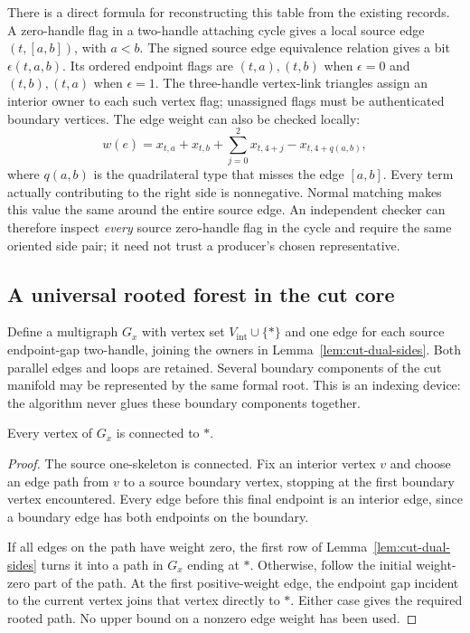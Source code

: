 There is a direct formula for reconstructing this table from the existing
records.  A zero-handle flag in a two-handle attaching cycle gives a local
source edge $(t,[a,b])$, with $a<b$.  The signed source edge equivalence
relation gives a bit $\epsilon(t,a,b)$.  Its ordered endpoint flags are
$(t,a),(t,b)$ when $\epsilon=0$ and $(t,b),(t,a)$ when $\epsilon=1$.
The three-handle vertex-link triangles assign an interior owner to each
such vertex flag; unassigned flags must be authenticated boundary vertices.
The edge weight can also be checked locally:
\begin{equation}
 w(e)=x_{t,a}+x_{t,b}
       +\sum_{j=0}^{2}x_{t,4+j}-x_{t,4+q(a,b)},
 \label{eq:cut-dual-local-weight}
\end{equation}
where $q(a,b)$ is the quadrilateral type that misses the edge $[a,b]$.
Every term actually contributing to the right side is nonnegative.
Normal matching makes this value the same around the entire source edge.
An independent checker can therefore inspect \emph{every} source
zero-handle flag in the cycle and require the same oriented side pair;
it need not trust a producer's chosen representative.

\subsection{A universal rooted forest in the cut core}

Define a multigraph $G_x$ with vertex set $V_{\mathrm{int}}\cup\{\ast\}$
and one edge for each source endpoint-gap two-handle, joining the owners
in Lemma~\ref{lem:cut-dual-sides}.  Both parallel edges and loops are
retained.  Several boundary components of the cut manifold may be
represented by the same formal root.  This is an indexing device: the
algorithm never glues these boundary components together.

\begin{lemma}
\label{lem:cut-dual-connected}
Every vertex of $G_x$ is connected to $\ast$.
\end{lemma}

\begin{proof}
The source one-skeleton is connected.  Fix an interior vertex $v$ and
choose an edge path from $v$ to a source boundary vertex, stopping at the
first boundary vertex encountered.  Every edge before this final endpoint
is an interior edge, since a boundary edge has both endpoints on the
boundary.

If all edges on the path have weight zero, the first row of
Lemma~\ref{lem:cut-dual-sides} turns it into a path in $G_x$ ending at
$\ast$.  Otherwise, follow the initial weight-zero part of the path.
At the first positive-weight edge, the endpoint gap incident to the
current vertex joins that vertex directly to $\ast$.  Either case gives
the required rooted path.  No upper bound on a nonzero edge weight has
been used.
\end{proof}

